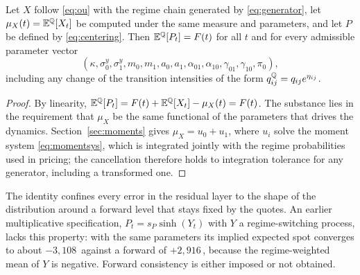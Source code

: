 \begin{proposition}
\label{prop:centering}
Let $X$ follow \eqref{eq:ou} with the regime chain generated by
\eqref{eq:generator}, let $\mu_X(t)=\mathbb{E}^{\mathbb{Q}}[X_t]$ be computed under the same
measure and parameters, and let $P$ be defined by \eqref{eq:centering}. Then
$\mathbb{E}^{\mathbb{Q}}[P_t]=F(t)$ for all $t$ and for every admissible parameter vector
\[
  \left(\kappa,\sigma^y_0,\sigma^y_1,m_0,m_1,a_0,a_1,\alpha_{01},\alpha_{10},
  \gamma_{01},\gamma_{10},\pi_0\right),
\]
including any change of the transition intensities of the form
$q_{ij}^{\mathbb{Q}}=q_{ij}e^{\eta_{ij}}$.
\end{proposition}

\begin{proof}
By linearity, $\mathbb{E}^{\mathbb{Q}}[P_t]=F(t)+\mathbb{E}^{\mathbb{Q}}[X_t]-\mu_X(t)=F(t)$. The substance
lies in the requirement that $\mu_X$ be the same functional of the parameters
that drives the dynamics. Section~\ref{sec:moments} gives
$\mu_X=u_0+u_1$, where $u_i$ solve the moment system
\eqref{eq:momentsys}, which is integrated jointly with the regime
probabilities used in pricing; the cancellation therefore holds to integration
tolerance for any generator, including a transformed one.
\end{proof}

The identity confines every error in the residual layer to the shape of the
distribution around a forward level that stays fixed by the quotes. An earlier
multiplicative specification, $P_t=s_P\sinh(Y_t)$ with $Y$ a regime-switching
process, lacks this property: with the same parameters its implied expected
spot converges to about $-3{,}108$\,\TRY{} against a forward of
$+2{,}916$\,\TRY, because the regime-weighted mean of $Y$ is negative. Forward
consistency is either imposed or not obtained.
